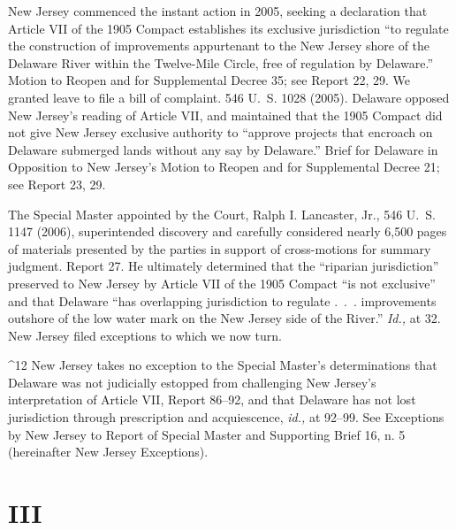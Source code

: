 {  New Jersey commenced the instant action in 2005, seeking a declaration
that Article VII of the 1905 Compact establishes its exclusive
jurisdiction ``to regulate the construction of improvements appurtenant
to the New Jersey shore of the Delaware River within the Twelve-Mile
Circle, free of regulation by Delaware.'' Motion to Reopen and for
Supplemental Decree 35; see Report 22, 29. We granted leave to file
a bill of complaint. 546 U.~S. 1028 (2005). Delaware opposed New
Jersey's reading of Article VII, and maintained that the 1905 Compact
did not give New Jersey exclusive authority to ``approve projects that
encroach on Delaware submerged lands without any say by Delaware.''
Brief for Delaware in Opposition to New Jersey's Motion to Reopen
and for Supplemental Decree 21; see Report 23, 29.

  The Special Master appointed by the Court, Ralph I. Lancaster, Jr.,
546 U.~S. 1147 (2006), superintended discovery and carefully
considered nearly 6,500 pages of materials presented by the parties
in support of cross-motions for summary judgment. Report 27. He
ultimately determined that the ``riparian jurisdiction'' preserved to
New Jersey by Article VII of the 1905 Compact ``is not exclusive''
and that Delaware ``has overlapping jurisdiction to regulate .~.~.
improvements outshore of the low water mark on the New Jersey side of
the River.'' \emph{Id.,} at 32. New Jersey filed exceptions to which
we now turn.\footnotemark[12] \newpage 

^12 New Jersey takes no exception to the Special Master's
determinations that Delaware was not judicially estopped from
challenging New Jersey's interpretation of Article VII, Report
86--92, and that Delaware has not lost jurisdiction through
prescription and acquiescence, \emph{id.,} at 92--99. See Exceptions
by New Jersey to Report of Special Master and Supporting Brief 16, n. 5
(hereinafter New Jersey Exceptions).

\section{III}

}
